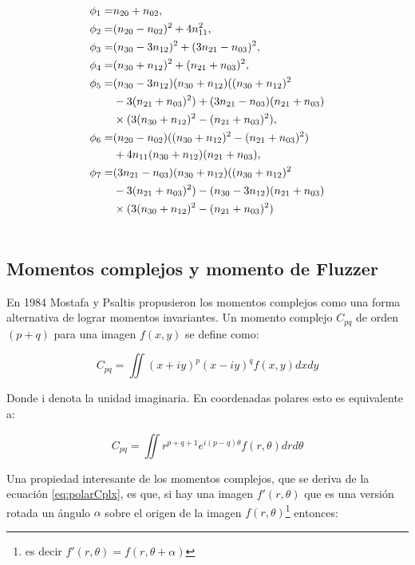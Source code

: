 \documentclass[a4paper, 11pt, oneside]{report}
\begin{document}
	\begin{align}
		\phi_1 =& n_{20} + n_{02}, \notag\\ 
		\phi_2 =& (n_{20} - n_{02})^{2} + 4n_{11}^{2}, \notag \\ 
		\phi_3 =& (n_{30} - 3n_{12})^{2} + (3n_{21} - n_{03})^{2}, \notag \\ 
		\phi_4 =& (n_{30} + n_{12})^{2} + (n_{21} + n_{03})^{2},\notag \\ 
		\phi_5 =& (n_{30} - 3n_{12})(n_{30} + n_{12})((n_{30} + n_{12})^{2} \notag \\
				& - 3(n_{21} + n_{03})^{2}) + (3n_{21} - n_{03})(n_{21} + n_{03})\notag\\ 
				& \times (3(n_{30} + n_{12})^{2} - (n_{21} + n_{03})^{2}),\notag\\ 
		\phi_6 =& (n_{20} - n_{02})((n_{30} + n_{12})^{2} - (n_{21} + n_{03})^{2})\notag\\
				& + 4n_{11}(n_{30} + n_{12})(n_{21} + n_{03}),\notag\\
		\phi_7 =& (3n_{21} - n_{03})(n_{30} + n_{12})((n_{30} + n_{12})^{2}\notag\\
				& - 3(n_{21} + n_{03})^{2}) - (n_{30} - 3n_{12})(n_{21} + n_{03}) \notag\\
				& \times (3(n_{30} + n_{12})^{2} - (n_{21} + n_{03})^{2}) \label{eq:huMom} \\ \notag
	\end{align}

\subsection{Momentos complejos y momento de Fluzzer}

En 1984 Mostafa y Psaltis \cite{mostaf84} propusieron los momentos complejos como una forma alternativa de lograr momentos invariantes. Un momento complejo $C_{pq}$ de orden $(p+q)$ para una imagen $f(x,y)$ se define como:

	\[ C_{pq} = \iint{ (x+iy)^p (x-iy)^q f(x,y) dx dy } \]
	
Donde i denota la unidad imaginaria. En coordenadas polares esto es equivalente a:

	\begin{equation}\label{eq:polarCplx}
		C_{pq} = \iint{ r^{p+q+1}e^{i(p-q)\theta}f(r,\theta) dr d\theta }
	\end{equation}

Una propiedad interesante de los momentos complejos, que se deriva de la ecuación \ref{eq:polarCplx}, es que, si hay una imagen $f'(r,\theta)$ que es una versión rotada un ángulo $\alpha$ sobre el origen de la imagen $f(r,\theta)$\footnote{es decir $f'(r,\theta) = f(r,\theta+\alpha)$} entonces:
\end{document}
